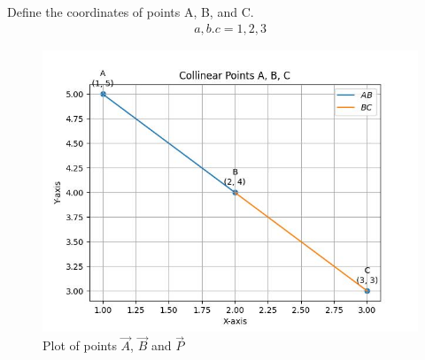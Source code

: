 \documentclass[journal]{IEEEtran}
\begin{document}
             Define the coordinates of points A, B, and C.
  \begin{align}
                a,b.c=1,2,3
  \end{align}
\begin{figure}[h!]
        \centering
        \includegraphics[width=0.7\linewidth]{Figs/Figure_1.jpg}
		\caption{Plot of points $\vec{A}$, $\vec{B}$ and $\vec{P}$}
        \label{stemplot}
\end{figure}
\end{document}
